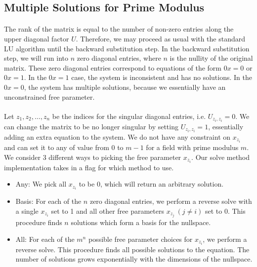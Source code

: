 \documentclass[11pt]{article}
\begin{document}
\subsection*{Multiple Solutions for Prime Modulus}

\paragraph{} The rank of the matrix is equal to the number of non-zero entries along the upper diagonal factor $U$.  Therefore, we may proceed as usual with the standard LU algorithm until the backward substitution step.  In the backward substitution step, we will run into $n$ zero diagonal entries, where $n$ is the nullity of the original matrix.  These zero diagonal entries correspond to equations of the form $0x = 0$ or $0x = 1$.  In the $0x = 1$ case, the system is inconsistent and has no solutions.  In the $0x = 0$, the system has multiple solutions, because we essentially have an unconstrained free parameter.


\paragraph{} Let $z_1, z_2, \dots, z_n$ be the indices for the singular diagonal entries, i.e. $U_{z_i, z_i} = 0$.  We can change the matrix to be no longer singular by setting $U_{z_i, z_i} = 1$, essentially adding an extra equation to the system.  We do not have any constraint on $x_{z_i}$ and can set it to any of value from 0 to $m - 1$ for a field with prime modulus $m$.  We consider 3 different ways to picking the free parameter $x_{z_i}$.  Our solve method implementation takes in a flag for which method to use.

\begin{itemize}
\item Any: We pick all $x_{z_i}$ to be 0, which will return an arbitrary solution.
\item Basis: For each of the $n$ zero diagonal entries, we perform a reverse solve with a single $x_{z_i}$ set to 1 and all other free parameters $x_{z_j} \> (j \ne i)$ set to 0.  This procedure finds $n$ solutions which form a basis for the nullspace.
\item All: For each of the $m^n$ possible free parameter choices for $x_{z_i}$, we perform a reverse solve.  This procedure finds all possible solutions to the equation.  The number of solutions grows exponentially with the dimensions of the nullspace.
\end{itemize}
\end{document}
